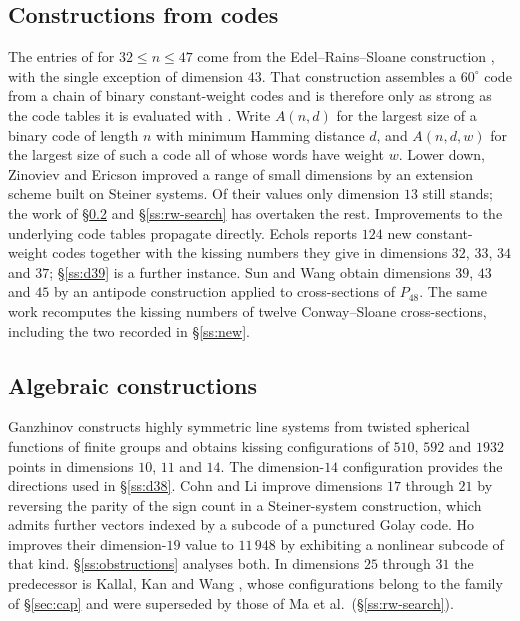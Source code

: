 \documentclass[11pt]{amsart}
\theoremstyle{remark}
\newcommand{\Pff}{P_{48}}
\begin{document}
\subsection{Constructions from codes}\label{ss:rw-codes}

The entries of \cite{cohn-table} for $32\le n\le47$ come from the
Edel--Rains--Sloane construction \cite{edel-rains-sloane1998}, with the single
exception of dimension $43$. That construction assembles a $60^\circ$ code from a
chain of binary constant-weight codes and is therefore only as strong as the
code tables it is evaluated with \cite{brouwer}. Write $A(n,d)$ for the largest
size of a binary code of length $n$ with minimum Hamming distance $d$, and
$A(n,d,w)$ for the largest size of such a code all of whose words have weight
$w$. Lower down, Zinoviev and Ericson
\cite{zinoviev-ericson1999} improved a range of small dimensions by an extension scheme
built on Steiner systems. Of their values only dimension $13$ still stands; the work
of \S\ref{ss:rw-algebra} and \S\ref{ss:rw-search} has overtaken the rest.
Improvements to the underlying code tables propagate directly. Echols
\cite{echols2026} reports $124$ new constant-weight codes together with the kissing
numbers they give in dimensions $32$, $33$, $34$ and $37$; \S\ref{ss:d39} is a
further instance. Sun and Wang \cite{sun-wang2026} obtain dimensions $39$, $43$ and $45$ by an
antipode construction applied to cross-sections of $\Pff$. The same work
recomputes the kissing numbers of twelve Conway--Sloane cross-sections, including
the two recorded in \S\ref{ss:new}.

\subsection{Algebraic constructions}\label{ss:rw-algebra}

Ganzhinov \cite{ganzhinov2025} constructs highly symmetric line systems from twisted
spherical functions of finite groups and obtains kissing configurations of
$510$, $592$ and $1932$ points in dimensions $10$, $11$ and $14$. The
dimension-$14$ configuration provides the directions used in \S\ref{ss:d38}. Cohn
and Li \cite{cohn-li2024} improve dimensions $17$ through $21$ by reversing the
parity of the sign count in a Steiner-system construction, which admits further
vectors indexed by a subcode of a punctured Golay code. Ho \cite{ho2026} improves
their dimension-$19$ value to $11\,948$ by exhibiting a nonlinear subcode of that
kind. \S\ref{ss:obstructions} analyses both. In dimensions $25$ through $31$ the
predecessor is Kallal, Kan and Wang \cite{kallal-kan-wang2017}, whose configurations
belong to the family of \S\ref{sec:cap} and were superseded by those of Ma et
al.\ (\S\ref{ss:rw-search}).
\end{document}

